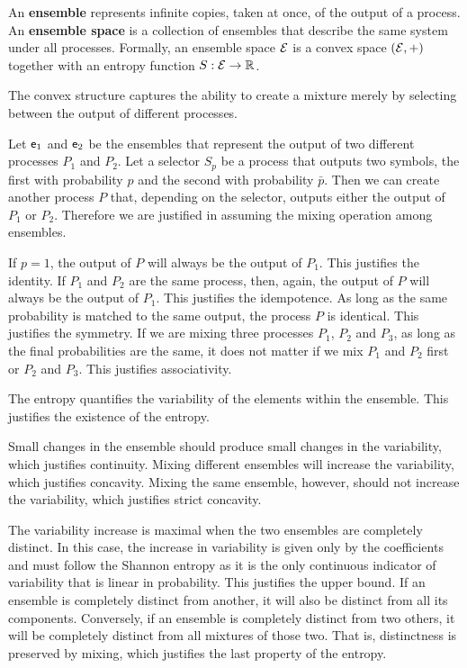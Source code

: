 \begin{defn}
	An \textbf{ensemble} represents infinite copies, taken at once, of the output of a process. An \textbf{ensemble space} is a collection of ensembles that describe the same system under all processes. Formally, an ensemble space $\mathcal{E}$ is a convex space $(\mathcal{E}, +)$ together with an entropy function $S : \mathcal{E} \to \mathbb{R}$.
\end{defn}
\begin{justification}
	The convex structure captures the ability to create a mixture merely by selecting between the output of different processes.
	
	Let $\mathsf{e}_1$ and $\mathsf{e}_2$ be the ensembles that represent the output of two different processes $P_1$ and $P_2$. Let a selector $S_p$ be a process that outputs two symbols, the first with probability $p$ and the second with probability $\bar{p}$. Then we can create another process $P$ that, depending on the selector, outputs either the output of $P_1$ or $P_2$. Therefore we are justified in assuming the mixing operation among ensembles.
	
	If $p=1$, the output of $P$ will always be the output of $P_1$. This justifies the identity. If $P_1$ and $P_2$ are the same process, then, again, the output of $P$ will always be the output of $P_1$. This justifies the idempotence. As long as the same probability is matched to the same output, the process $P$ is identical. This justifies the symmetry. If we are mixing three processes $P_1$, $P_2$ and $P_3$, as long as the final probabilities are the same, it does not matter if we mix $P_1$ and $P_2$ first or $P_2$ and $P_3$. This justifies associativity.
	
	The entropy quantifies the variability of the elements within the ensemble. This justifies the existence of the entropy.
	
	Small changes in the ensemble should produce small changes in the variability, which justifies continuity. Mixing different ensembles will increase the variability, which justifies concavity. Mixing the same ensemble, however, should not increase the variability, which justifies strict concavity. 
	
	The variability increase is maximal when the two ensembles are completely distinct. In this case, the increase in variability is given only by the coefficients and must follow the Shannon entropy as it is the only continuous indicator of variability that is linear in probability. This justifies the upper bound. If an ensemble is completely distinct from another, it will also be distinct from all its components. Conversely, if an ensemble is completely distinct from two others, it will be completely distinct from all mixtures of those two. That is, distinctness is preserved by mixing, which justifies the last property of the entropy.
\end{justification}

